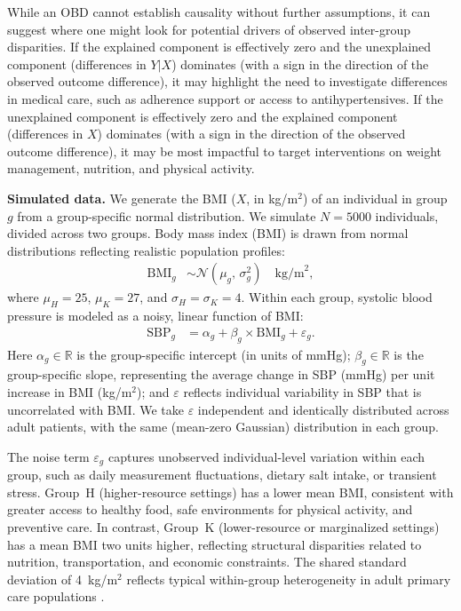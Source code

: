While an OBD cannot establish causality without further assumptions, it can suggest where one might look for potential drivers of observed inter-group disparities.
If the explained component is effectively zero and the unexplained component (differences in $Y|X$) dominates (with a sign in the direction of the observed outcome difference), it may highlight the need to investigate differences in medical care, such as adherence support or access to antihypertensives.
If the unexplained component is effectively zero and the explained component (differences in $X$) dominates (with a sign in the direction of the observed outcome difference), it may be most impactful to target interventions on weight management, nutrition, and physical activity. 

\textbf{Simulated data.}
We generate the BMI ($X$, in kg/m$^2$) of an individual in group \( g \) from a group-specific normal distribution.
We simulate \( N = 5000 \) individuals, divided across two groups. Body mass index (BMI) is drawn from normal distributions reflecting realistic population profiles:
\begin{align*}
    \text{BMI}_g &\sim \mathcal{N}(\mu_g ,\, \sigma_g^2) \quad \text{kg/m}^2,
\end{align*}
where \( \mu_H = 25 \), \( \mu_K = 27 \), and \( \sigma_H = \sigma_K = 4 \). Within each group, systolic blood pressure is modeled as a noisy, linear function of BMI:
\begin{align}
    \text{SBP}_g &= \alpha_g + \beta_g \times \text{BMI}_g + \varepsilon_g.
\end{align}
Here $\alpha_g \in \mathbb{R}$ is the group-specific intercept (in units of mmHg); $\beta_g \in \mathbb{R}$ is the group-specific slope, representing the average change in SBP (mmHg) per unit increase in BMI (kg/m$^2$); and $\varepsilon$ reflects individual variability in SBP that is uncorrelated with BMI. We take $\varepsilon$ independent and identically distributed across adult patients, with the same (mean-zero Gaussian) distribution in each group.

The noise term \( \varepsilon_g \) captures unobserved individual-level variation within each group, such as daily measurement fluctuations, dietary salt intake, or transient stress. 
Group~H (higher-resource settings) has a lower mean BMI, consistent with greater access to healthy food, safe environments for physical activity, and preventive care. 
In contrast, Group~K (lower-resource or marginalized settings) has a mean BMI two units higher, reflecting structural disparities related to nutrition, transportation, and economic constraints. 
The shared standard deviation of 4~kg/m\(^2\) reflects typical within-group heterogeneity in adult primary care populations \citep{block2013population}.

